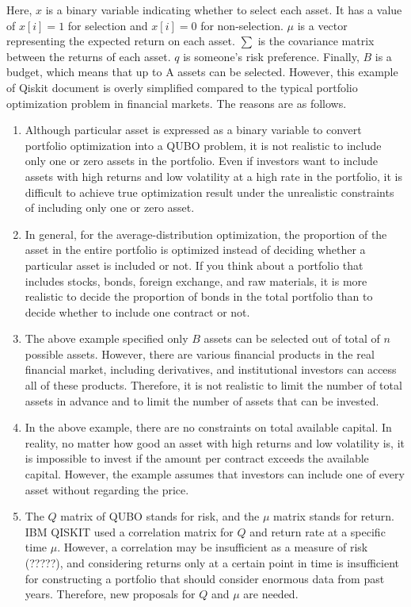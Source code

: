 Here, $x$ is a binary variable indicating whether to select each asset. It has a value of $x[i]=1$ for selection and $x[i]=0$ for non-selection. $\mu$  is a vector representing the expected return on each asset. $\displaystyle\sum$  is the covariance matrix between the returns of each asset. $q$ is someone's risk preference. Finally, $B$  is a budget, which means that up to A assets can be selected. However, this example of Qiskit document is overly simplified compared to the typical portfolio optimization problem in financial markets. The reasons are as follows.
\begin{enumerate}
\item Although particular asset is expressed as a binary variable to convert portfolio optimization into a QUBO problem, it is not realistic to include only one or zero assets in the portfolio. Even if investors want to include assets with high returns and low volatility  at a high rate in the portfolio, it is difficult to achieve true optimization result under the unrealistic constraints of including only one or zero asset. 

\item In general, for the average-distribution optimization, the proportion of the asset in the entire portfolio is optimized instead of deciding whether a particular asset is included or not. If you think about a portfolio that includes stocks, bonds, foreign exchange, and raw materials, it is more realistic to decide the proportion of bonds in the total portfolio than to decide whether to include one contract or not.

\item The above example specified only $B$ assets can be selected out of total of $n$  possible assets. However, there are various financial products in the real financial market, including derivatives, and institutional investors can access all of these products. Therefore, it is not realistic to limit the number of total assets in advance and to limit the number of assets that can be invested. 

\item In the above example, there are no constraints on total available capital. In reality, no matter how good an asset with high returns and low volatility is, it is impossible to invest if the amount per contract exceeds the available capital. However, the example assumes that investors can include one of every asset without regarding the price. 

\item  The $Q$ matrix of QUBO stands for risk, and the $\mu$ matrix stands for return. IBM QISKIT used a correlation matrix for $Q$ and return rate at a specific time $\mu$. However, a correlation may be insufficient as a measure of risk (?????), and considering returns only at a certain point in time is insufficient for constructing a portfolio that should consider enormous data from past years. Therefore, new proposals for $Q$ and $\mu$ are needed.

\end{enumerate}

